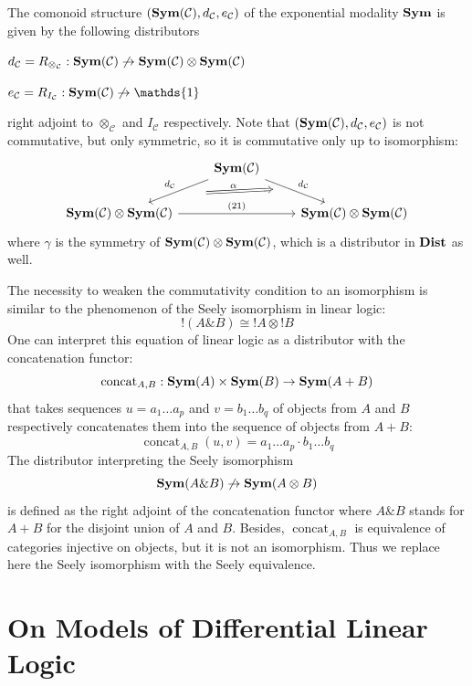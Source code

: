 \documentclass[8pt]{article}
\theoremstyle{definition}
\theoremstyle{definition}
\theoremstyle{definition}
\theoremstyle{definition}
\theoremstyle{definition}
\theoremstyle{definition}
\theoremstyle{definition}
\theoremstyle{definition}
\theoremstyle{definition}
\theoremstyle{definition}
\theoremstyle{definition}
\theoremstyle{definition}
\theoremstyle{definition}
\theoremstyle{definition}
\theoremstyle{question}
\DeclareMathOperator{\bang}{!}
\begin{document}
The comonoid structure $({\bf Sym}(\mathcal{C}), d_{\mathcal{C}}, e_{\mathcal{C}})$ of the exponential modality 
${\bf Sym}$ is given by the following distributors
\begin{center}
  $d_{\mathcal{C}} = R_{\otimes_{\mathcal{C}}} : {\bf Sym}(\mathcal{C}) \not\to {\bf Sym}(\mathcal{C}) \otimes {\bf Sym}(\mathcal{C})$

  $e_{\mathcal{C}} = R_{I_{\mathcal{C}}} : {\bf Sym}(\mathcal{C}) \not\to \mathds{1}$
\end{center}
right adjoint to $\otimes_{\mathcal{C}}$ and $I_{\mathcal{C}}$ respectively. Note that $({\bf Sym}(\mathcal{C}), d_{\mathcal{C}}, e_{\mathcal{C}})$
is not commutative, but only symmetric, so it is commutative only up to isomorphism:
\[
\begin{tikzcd}
& {\bf Sym}(\mathcal{C}) \ar[dl, "d_{\mathcal{C}}"', ""{name=d1}] \ar[dr, "d_{\mathcal{C}}", ""{name=d2}] \\
{\bf Sym}(\mathcal{C}) \otimes {\bf Sym}(\mathcal{C}) \ar[rr, "(21)"] && {\bf Sym}(\mathcal{C}) \otimes {\bf Sym}(\mathcal{C})
\arrow[from=d1, to=d2, Rightarrow, "\alpha", shorten=6mm]
\end{tikzcd}
\]
where $\gamma$ is the symmetry of ${\bf Sym}(\mathcal{C}) \otimes {\bf Sym}(\mathcal{C})$, which is a distributor in ${\bf Dist}$
as well.

The necessity to weaken the commutativity condition to an isomorphism is similar to the phenomenon of the Seely
isomorphism in linear logic:
\[
\bang (A \& B) \cong \bang A \otimes \bang B
\]
One can interpret this equation of linear logic as a distributor with the concatenation functor:
\[
\operatorname{concat}_{A,B} : {\bf Sym}(A) \times {\bf Sym}(B) \to {\bf Sym}(A + B) 
\]
that takes sequences $u = a_1 \ldots a_p$ and $v = b_1 \ldots b_q$ of objects from $A$ and $B$ respectively concatenates them
into the sequence of objects from $A + B$:
\[
\operatorname{concat}_{A,B}(u,v) = a_1 \ldots a_p \cdot b_1 \ldots b_q
\]
The distributor interpreting the Seely isomorphism
\[
{\bf Sym}(A \& B) \not\to {\bf Sym}(A \otimes B)
\]
is defined as the right adjoint of the concatenation functor where $A \& B$ stands for $A + B$
for the disjoint union of $A$ and $B$. Besides, $\operatorname{concat}_{A,B}$ is equivalence of categories injective
on objects, but it is not an isomorphism. Thus we replace here the Seely isomorphism with the Seely equivalence.

\section{On Models of Differential Linear Logic}
\end{document}
